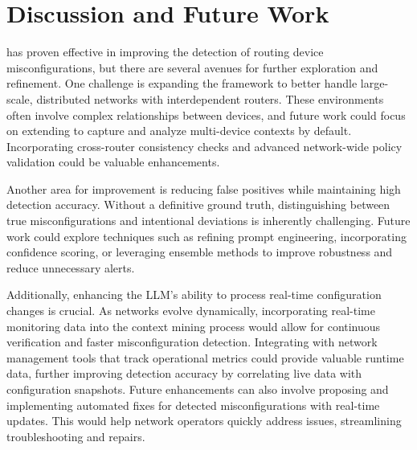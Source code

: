\section{Discussion and Future Work}
\label{sec:future}

\sysname{} has proven effective in improving the detection of routing device misconfigurations, but there are several avenues for further exploration and refinement. One challenge is expanding the framework to better handle large-scale, distributed networks with interdependent routers. These environments often involve complex relationships between devices, and future work could focus on extending \sysname{} to capture and analyze multi-device contexts by default. Incorporating cross-router consistency checks and advanced network-wide policy validation could be valuable enhancements.

Another area for improvement is reducing false positives while maintaining high detection accuracy. Without a definitive ground truth, distinguishing between true misconfigurations and intentional deviations is inherently challenging. Future work could explore techniques such as refining prompt engineering, incorporating confidence scoring, or leveraging ensemble methods to improve robustness and reduce unnecessary alerts.

Additionally, enhancing the LLM's ability to process real-time configuration changes is crucial. As networks evolve dynamically, incorporating real-time monitoring data into the context mining process would allow for continuous verification and faster misconfiguration detection. Integrating \sysname{} with network management tools that track operational metrics could provide valuable runtime data, further improving detection accuracy by correlating live data with configuration snapshots.
Future enhancements can also involve proposing and implementing automated fixes for detected misconfigurations with real-time updates. This would help network operators quickly address issues, streamlining troubleshooting and repairs.